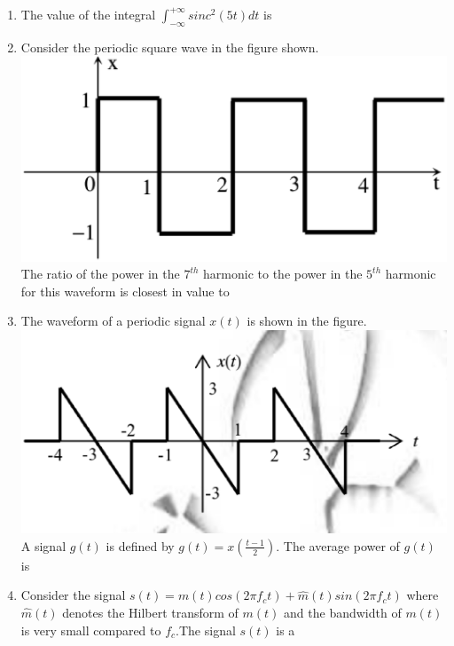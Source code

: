 \documentclass[journal,12pt,twocolumn]{IEEEtran}
\begin{document}
\begin{enumerate}[1.]
\item The value of the integral $\int_{-\infty}^{+\infty} sinc^{2}(5t) dt$ is \underline{\hspace{1cm}}

\item Consider the periodic square wave in the figure shown.
\includegraphics[scale=0.4]{fig13.eps}
\newline The ratio of the power in the $7^{th}$ harmonic to the power in the $5^{th}$ harmonic for this waveform is closest in value to \underline{\hspace{2cm}}\\






\item The waveform of a periodic signal $x(t)$ is shown in the figure.\\
\includegraphics[scale=0.4]{fig14.eps}
\newline A signal $g(t)$ is defined by $g(t)=x(\frac{t-1}{2})$. The average power of $g(t)$ is \underline{\hspace{2cm}}\\


\item Consider the signal $s(t)=m(t)cos(2\pi f_c t)+\hat{m}(t)sin(2\pi f_c t)$ where $\hat{m}(t)$ denotes the Hilbert transform of $m(t)$ and the bandwidth of $m(t)$ is very small compared to $f_c$.The signal $s(t)$ is a


\end{enumerate}
\end{document}
